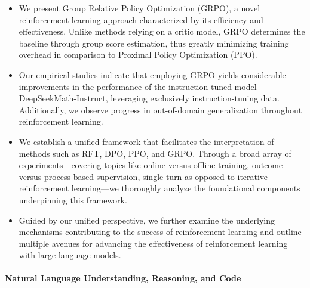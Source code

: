 \begin{itemize}[topsep=0pt]
\begin{itemize}[topsep=0pt]
    \item We present Group Relative Policy Optimization (GRPO), a novel reinforcement learning approach characterized by its efficiency and effectiveness. Unlike methods relying on a critic model, GRPO determines the baseline through group score estimation, thus greatly minimizing training overhead in comparison to Proximal Policy Optimization (PPO).
    \item Our empirical studies indicate that employing GRPO yields considerable improvements in the performance of the instruction-tuned model DeepSeekMath-Instruct, leveraging exclusively instruction-tuning data. Additionally, we observe progress in out-of-domain generalization throughout reinforcement learning.
    \item We establish a unified framework that facilitates the interpretation of methods such as RFT, DPO, PPO, and GRPO. Through a broad array of experiments—covering topics like online versus offline training, outcome versus process-based supervision, single-turn as opposed to iterative reinforcement learning—we thoroughly analyze the foundational components underpinning this framework.
    \item Guided by our unified perspective, we further examine the underlying mechanisms contributing to the success of reinforcement learning and outline multiple avenues for advancing the effectiveness of reinforcement learning with large language models.
\end{itemize}

\paragraph{Natural Language Understanding, Reasoning, and Code}


\end{itemize}
